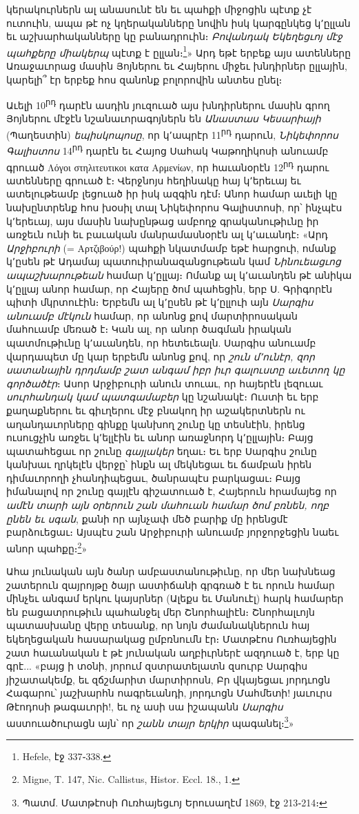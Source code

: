 \documentclass{article}
\begin{document}
{կերակուրներն ալ անասունէ են եւ պահքի միջոցին պէտք չէ ուտուին, ապա թէ ոչ կղերականները նովին իսկ կարգընկեց կ՚ըլլան եւ աշխարհականները կը բանադրուին։ \emph{Բովանդակ Եկեղեցւոյ մէջ պահքերը միակերպ} պէտք է ըլլան։\footnote{Hefele, էջ 337֊338.}» Արդ եթէ երբեք այս ատենները Առաջաւորաց մասին Յոյներու եւ Հայերու միջեւ խնդիրներ ըլլային, կարելի՞ էր երբեք հոս զանոնք բոլորովին անտես ընել։

Աւելի 10\textsuperscript{րդ} դարէն ասդին յուզուած այս խնդիրներու մասին գրող Յոյներու մէջէն նշանաւորագոյներն են \emph{Անաստաս Կեսարիայի} (Պաղեստին) \emph{եպիսկոպոսը}, որ կ՚ապրէր 11\textsuperscript{րդ} դարուն, \emph{Նիկեփորոս Գալիստոս} 14\textsuperscript{րդ} դարէն եւ Հայոց Սահակ Կաթողիկոսի անուամբ գրուած Λόγοι στηλιτευτικοι κατα Αρμενίων, որ հաւանօրէն 12\textsuperscript{րդ} դարու ատենները գրուած է։ Վերջնոյս հեղինակը հայ կ՚երեւայ եւ ատելութեամբ լեցուած իր իսկ ազգին դէմ։ Անոր համար աւելի կը նախընտրենք հոս խօսիլ տալ Նիկեփորոս Գալիստոսի, որ՝ ինչպէս կ՚երեւայ, այս մասին նախընթաց ամբողջ գրականութիւնը իր առջեւն ունի եւ բաւական մանրամասնօրէն ալ կ՚աւանդէ։ «Արդ \emph{Արջիբուրի} (= Αρτζιβούρ!) պահքի նկատմամբ եթէ հարցուի, ոմանք կ՚ըսեն թէ Ադամայ պատուիրանազանցութեան կամ \emph{Նինուեացւոց ապաշխարութեան} համար կ՚ըլլայ։ Ոմանք ալ կ՚աւանդեն թէ անիկա կ՚ըլլայ անոր համար, որ Հայերը ծոմ պահեցին, երբ Ս. Գրիգորէն պիտի մկրտուէին։ Երբեմն ալ կ՚ըսեն թէ կ՚ըլլուի այն \emph{Սարգիս անուամբ մէկուն} համար, որ անոնց քով մարտիրոսական մահուամբ մեռած է։ Կան ալ, որ անոր ծագման իրական պատմութիւնը կ՚աւանդեն, որ հետեւեալն. Սարգիս անուամբ վարդապետ մը կար երբեմն անոնց քով, որ \emph{շուն մ՚ունէր, զոր սատանային դրդմամբ շատ անգամ իբր իւր գալուստը աւետող կը գործածէր}։ Ասոր Արջիբուրի անուն տուաւ, որ հայերէն լեզուաւ \emph{սուրհանդակ կամ պատգամաբեր} կը նշանակէ։ Ուստի եւ երբ քաղաքներու եւ գիւղերու մէջ բնակող իր աշակերտներն ու աղանդաւորները գինքը կանխող շունը կը տեսնէին, իրենց ուսուցչին առջեւ կ՚ելլէին եւ անոր առաջնորդ կ՚ըլլային։ Բայց պատահեցաւ որ շունը \emph{գայլակեր} եղաւ։ Եւ երբ Սարգիս շունը կանխաւ ղրկելէն վերջը՝ ինքն ալ մեկնեցաւ եւ ճամբան իրեն դիմաւորողի չհանդիպեցաւ, ծանրապէս բարկացաւ։ Բայց իմանալով որ շունը գայլէն գիշատուած է, Հայերուն հրամայեց որ \emph{ամէն տարի այն օրերուն շան մահուան համար ծոմ բռնեն, ողբ ընեն եւ սգան}, քանի որ այնչափ մեծ բարիք մը իրենցմէ բարձուեցաւ։ Այսպէս շան Արջիբուրի անուամբ յորջորջեցին նաեւ անոր պահքը։\footnote{Migne, T. 147, Nic. Callistus, Histor. Eccl. 18., 1.}»

Ահա յունական այն ծանր ամբաստանութիւնը, որ մեր նախնեաց շատերուն զայրոյթը ծայր աստիճանի գրգռած է եւ որուն համար մինչեւ անգամ երկու կայսրներ (Ալեքս եւ Մանուէլ) հարկ համարեր են բացատրութիւն պահանջել մեր Շնորհալիէն։ Շնորհալւոյն պատասխանը վերը տեսանք, որ նոյն ժամանակներուն հայ եկեղեցական հասարակաց ըմբռնումն էր։ Մատթէոս Ուռհայեցին շատ հաւանական է թէ յունական աղբիւրներէ ազդուած է, երբ կը գրէ... «բայց ի տօնի, յորում զստրատելատն զսուրբ Սարգիս յիշատակեմք, եւ զճշմարիտ մարտիրոսն, Բր վկայեցաւ յորդւոցն Հագարու՝ յաշխարհն ոագրեւանդի, յորդւոցն Մահմետի! յաւուրս Թէոդոսի թագաւորի!, եւ ոչ ասի սա իշապանն \emph{Սարգիս} աստուածուրացն այն՝ որ \emph{շանն տայր երկիր} պագանել։\footnote{Պատմ. Մատթէոսի Ուռհայեցւոյ Երուսաղէմ 1869, էջ 213֊214։}»

}
\end{document}
